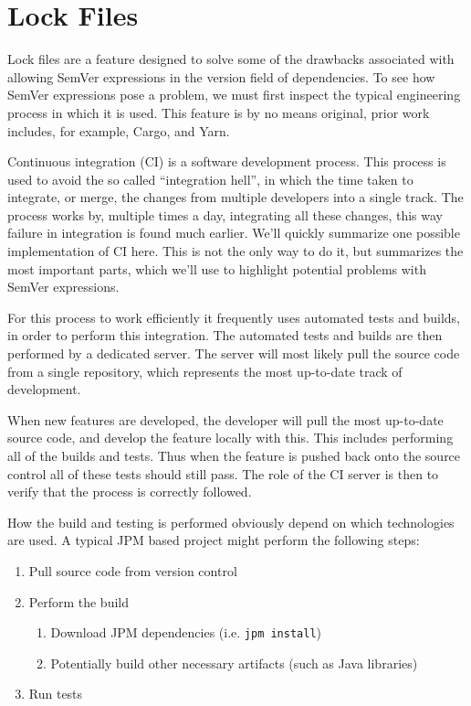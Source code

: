 \section{Lock Files}
\label{sec:lockfiles}


Lock files are a feature designed to solve some of the drawbacks associated
with allowing SemVer expressions in the version field of dependencies. To see
how SemVer expressions pose a problem, we must first inspect the typical
engineering process in which it is used. This feature is by no means original,
prior work includes, for example, Cargo, and Yarn. %

Continuous integration (CI) is a software development process. This process is
used to avoid the so called ``integration hell'', in which the time taken to
integrate, or merge, the changes from multiple developers into a single track.
The process works by, multiple times a day, integrating all these changes, this
way failure in integration is found much earlier. We'll quickly summarize one
possible implementation of CI here. This is not the only way to do it, but
summarizes the most important parts, which we'll use to highlight potential
problems with SemVer expressions.

For this process to work efficiently it frequently uses automated tests and
builds, in order to perform this integration. The automated tests and builds
are then performed by a dedicated server. The server will most likely pull the
source code from a single repository, which represents the most up-to-date
track of development.

When new features are developed, the developer will pull the most up-to-date
source code, and develop the feature locally with this. This includes
performing all of the builds and tests. Thus when the feature is pushed back
onto the source control all of these tests should still pass. The role of the
CI server is then to verify that the process is correctly followed.

How the build and testing is performed obviously depend on which technologies
are used. A typical JPM based project might perform the following steps:

\begin{enumerate}
\item Pull source code from version control
\item Perform the build
    \begin{enumerate}
        \item Download JPM dependencies (i.e. \verb!jpm install!)
        \item Potentially build other necessary artifacts (such as Java
                libraries)
    \end{enumerate}
\item Run tests
\end{enumerate}


